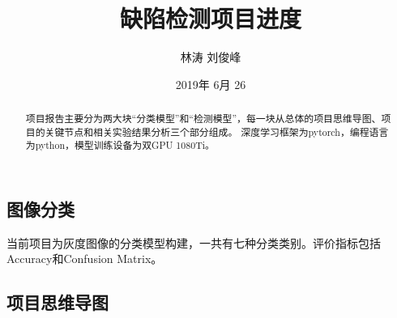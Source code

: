 \documentclass{article}
\begin{document}
\begin{CJK}{UTF8}{gbsn}
\CJKindent

\title{缺陷检测项目进度}
\author{林涛 刘俊峰}
\date{2019年 6月 26}
\maketitle




\begin{abstract}
	\hspace{2em}
	项目报告主要分为两大块“分类模型”和“检测模型”，每一块从总体的项目思维导图、项目的关键节点和相关实验结果分析三个部分组成。
  深度学习框架为pytorch，编程语言为python，模型训练设备为双GPU 1080Ti。
\end{abstract}

\section{图像分类}
当前项目为灰度图像的分类模型构建，一共有七种分类类别。评价指标包括Accuracy和Confusion Matrix。
\subsection{项目思维导图}

\pagestyle{empty}
\begin{figure}[htb]
\centering
{}
\end{figure}
\end{CJK}
\end{document}

